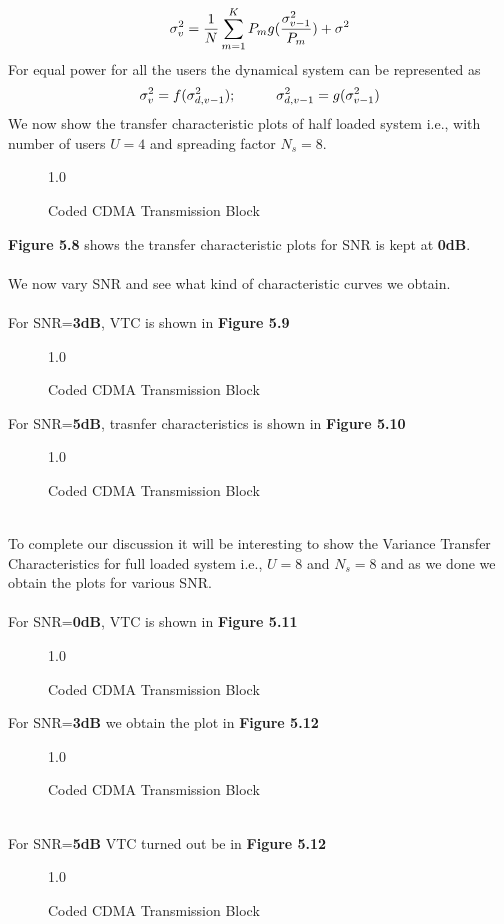 \begin{equation}
\sigma_v^2=\frac{\hbox{$1$}}{\hbox{$N$}}\sum\limits_{m=1}^{K}P_mg(\frac{\hbox{$\sigma_{v-1}^2$}}{\hbox{$P_m$}})+\sigma^2
\end{equation}
For equal power for all the users the dynamical system can be represented as
\begin{equation}
\sigma_v^2=f(\sigma^2_{d,v-1}); \hspace{10mm} \sigma^2_{d,v-1}=g(\sigma^2_{v-1})
\end{equation}
\newpage
We now show the transfer characteristic plots of half loaded system i.e., with number of users $U=4$ and spreading factor $N_s=8$. 
\begin{figure}[htb]
\centerline{  {1.0} }
\caption{Coded CDMA Transmission Block}
\end{figure}
\textbf{Figure 5.8} shows the transfer characteristic plots for SNR is kept at \textbf{0dB}.\\ \\
We now vary SNR and see what kind of characteristic curves we obtain. \\ \\
For SNR=\textbf{3dB}, VTC is shown in \textbf{Figure 5.9}
\begin{figure}[htb]
\centerline{  {1.0} }
\caption{Coded CDMA Transmission Block}
\end{figure}
\newpage
For SNR=\textbf{5dB}, trasnfer characteristics is shown in \textbf{Figure 5.10}
\begin{figure}[htb]
\centerline{  {1.0} }
\caption{Coded CDMA Transmission Block}
\end{figure}\\
To complete our discussion it will be interesting to show the Variance Transfer Characteristics for full loaded system i.e., $U=8$ and $N_s=8$ and as we done we obtain the plots for various SNR.\\ \\
For SNR=\textbf{0dB}, VTC is shown in \textbf{Figure 5.11}
\begin{figure}[htb]
\centerline{  {1.0} }
\caption{Coded CDMA Transmission Block}
\end{figure}
\newpage
For SNR=\textbf{3dB} we obtain the plot in \textbf{Figure 5.12}
\begin{figure}[htb]
\centerline{  {1.0} }
\caption{Coded CDMA Transmission Block}
\end{figure}\\
For SNR=\textbf{5dB} VTC turned out be in \textbf{Figure 5.12}
\begin{figure}[htb]
\centerline{  {1.0} }
\caption{Coded CDMA Transmission Block}
\end{figure}\\
